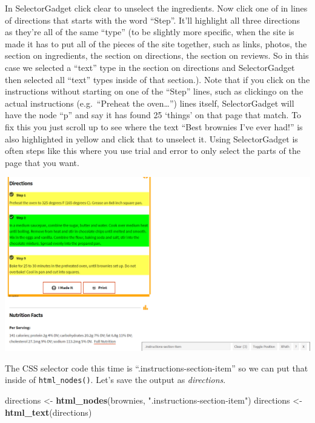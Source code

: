 \documentclass[
  12pt,
]{book}
\newenvironment{Shaded}{\begin{snugshade}}{\end{snugshade}}
\newcommand{\KeywordTok}[1]{\textcolor[rgb]{0.27,0.27,0.27}{\textbf{#1}}}
\newcommand{\NormalTok}[1]{#1}
\newcommand{\StringTok}[1]{\textcolor[rgb]{0.5,0.5,0.5}{#1}}
\begin{document}
In SelectorGadget click clear to unselect the ingredients. Now click one of in lines of directions that starts with the word ``Step''. It'll highlight all three directions as they're all of the same ``type'' (to be slightly more specific, when the site is made it has to put all of the pieces of the site together, such as links, photos, the section on ingredients, the section on directions, the section on reviews. So in this case we selected a ``text'' type in the section on directions and SelectorGadget then selected all ``text'' types inside of that section.). Note that if you click on the instructions without starting on one of the ``Step'' lines, such as clickingo on the actual instructions (e.g.~``Preheat the oven\ldots{}'') lines itself, SelectorGadget will have the node ``p'' and say it has found 25 `things' on that page that match. To fix this you just scroll up to see where the text ``Best brownies I've ever had!'' is also highlighted in yellow and click that to unselect it. Using SelectorGadget is often steps like this where you use trial and error to only select the parts of the page that you want.

\includegraphics{images/brownies_5.PNG}

The CSS selector code this time is ``.instructions-section-item'' so we can put that inside of \texttt{html\_nodes()}. Let's save the output as \emph{directions}.

\begin{Shaded}
\begin{Highlighting}[]
\NormalTok{directions \textless{}{-}}\StringTok{ }\KeywordTok{html\_nodes}\NormalTok{(brownies, }\StringTok{".instructions{-}section{-}item"}\NormalTok{)}
\NormalTok{directions \textless{}{-}}\StringTok{ }\KeywordTok{html\_text}\NormalTok{(directions)}
\end{Highlighting}
\end{Shaded}
\end{document}
